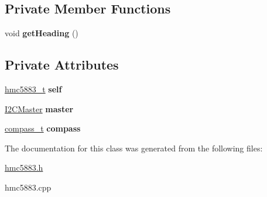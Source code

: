 \subsection*{Private Member Functions}
\begin{DoxyCompactItemize}
\item 
\mbox{\label{classHmc5883_ad4af7af089cc97b70cd75f705773e509}} 
void {\bfseries get\+Heading} ()
\end{DoxyCompactItemize}
\subsection*{Private Attributes}
\begin{DoxyCompactItemize}
\item 
\mbox{\label{classHmc5883_a7864e224789881243d69cefce89d7918}} 
\hyperlink{structhmc5883__t}{hmc5883\+\_\+t} {\bfseries self}
\item 
\mbox{\label{classHmc5883_a8c46d4fe172002c5020423939d2e98d1}} 
\hyperlink{classI2CMaster}{I2\+C\+Master} {\bfseries master}
\item 
\mbox{\label{classHmc5883_a3db3c0edeb0859b84b4530f935bc75b1}} 
\hyperlink{structcompass__t}{compass\+\_\+t} {\bfseries compass}
\end{DoxyCompactItemize}


The documentation for this class was generated from the following files\+:\begin{DoxyCompactItemize}
\item 
\hyperlink{hmc5883_8h}{hmc5883.\+h}\item 
hmc5883.\+cpp\end{DoxyCompactItemize}

